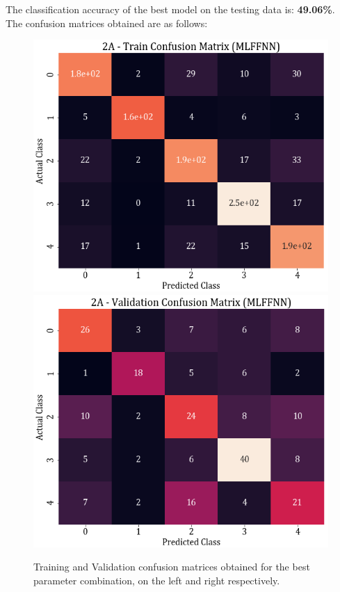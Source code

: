 \documentclass[11pt,a4paper]{article}
\newcommand{\noi}{\noindent}
\begin{document}
\noi
The classification accuracy of the best model on the testing data is: \textbf{49.06\%}. \\

\noi
The confusion matrices obtained are as follows:
\begin{figure}[H]
    \centering
    \includegraphics[scale=0.4]{images/2A_MLFFNN_train_confmat.png}
    \includegraphics[scale=0.4]{images/2A_MLFFNN_val_confmat.png}
    \caption{Training and Validation confusion matrices obtained for the best parameter combination, on the left and right respectively.}
\end{figure}
\end{document}
